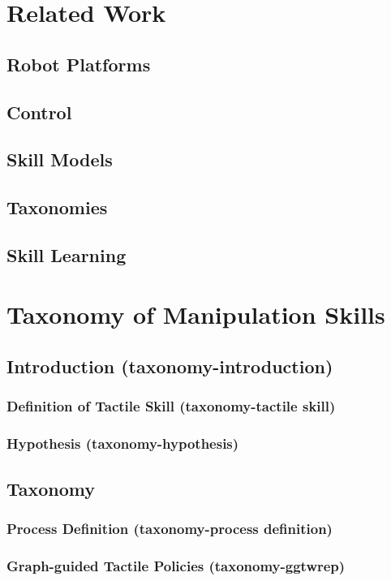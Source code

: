 \chapter{Related Work}
\section{Robot Platforms}
\section{Control}
\section{Skill Models}
\section{Taxonomies}
\section{Skill Learning}

\chapter{Taxonomy of Manipulation Skills}
\section{Introduction (taxonomy-introduction)}
\subsection{Definition of Tactile Skill (taxonomy-tactile skill)}
\subsection{Hypothesis (taxonomy-hypothesis)}
\section{Taxonomy}
\subsection{Process Definition (taxonomy-process definition)}
\subsection{Graph-guided Tactile Policies (taxonomy-ggtwrep)}
